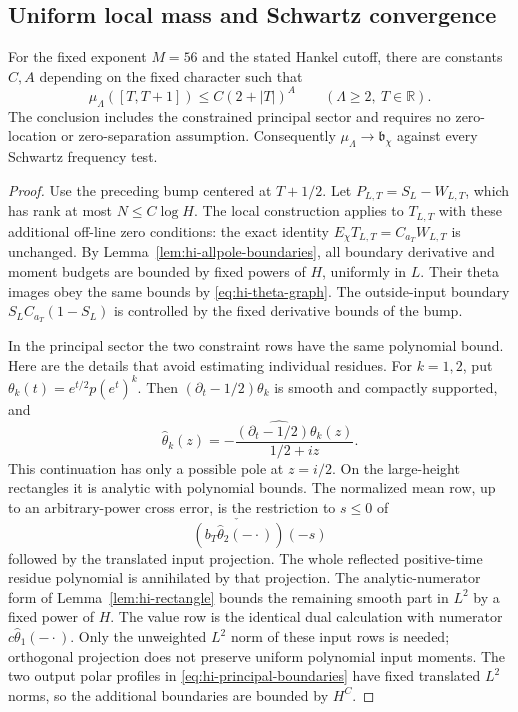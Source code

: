 \subsection{Uniform local mass and Schwartz convergence}

\begin{theorem}\label{thm:hi-uniform-mass}
For the fixed exponent $M=56$ and the stated Hankel cutoff, there are
constants $C,A$ depending on the fixed character such that
\[
              \mu_\Lambda([T,T+1])\le C(2+|T|)^A
                     \qquad(\Lambda\ge2,\ T\in\mathbb R).
\]
The conclusion includes the constrained principal sector and requires no
zero-location or zero-separation assumption. Consequently
$\mu_\Lambda\to\mathfrak b_\chi$ against every Schwartz frequency
test.
\end{theorem}
\begin{proof}
Use the preceding bump centered at $T+1/2$. Let
$P_{L,T}=S_L-W_{L,T}$, which has rank at most $N\le C\log H$.
The local construction applies to $T_{L,T}$ with these additional
off-line zero conditions: the exact identity
$E_\chi T_{L,T}=C_{a_T}W_{L,T}$ is unchanged. By
Lemma~\ref{lem:hi-allpole-boundaries}, all boundary derivative and moment
budgets are bounded by fixed powers of $H$, uniformly in $L$. Their
theta images obey the same bounds by \eqref{eq:hi-theta-graph}.
The outside-input boundary $S_LC_{a_T}(1-S_L)$ is controlled by the
fixed derivative bounds of the bump.

In the principal sector the two constraint rows have the same polynomial
bound. Here are the details that avoid estimating individual residues.
For $k=1,2$, put $\theta_k(t)=e^{t/2}p(e^t)^k$. Then
$(\partial_t-1/2)\theta_k$ is smooth and compactly supported, and
\[
 \widehat\theta_k(z)
 =-\frac{\widehat{(\partial_t-1/2)\theta_k}(z)}{1/2+iz}.
\]
This continuation has only a possible pole at $z=i/2$. On the large-height
rectangles it is analytic with polynomial bounds. The normalized mean
row, up to an arbitrary-power cross error, is the restriction to $s\le0$
of
\[
       \check{(b_T\widehat\theta_2(-\cdot))}(-s)
\]
followed by the translated input projection. The whole reflected
positive-time residue polynomial is annihilated by that projection.
The analytic-numerator form of Lemma~\ref{lem:hi-rectangle} bounds the
remaining smooth part in $L^2$ by a fixed power of $H$. The value row
is the identical dual calculation with numerator
$c\widehat\theta_1(-\cdot)$. Only the unweighted $L^2$ norm of these
input rows is needed; orthogonal projection does not preserve uniform
polynomial input moments. The two output polar profiles in
\eqref{eq:hi-principal-boundaries} have fixed translated $L^2$ norms,
so the additional boundaries are bounded by $H^C$.


\end{proof}
